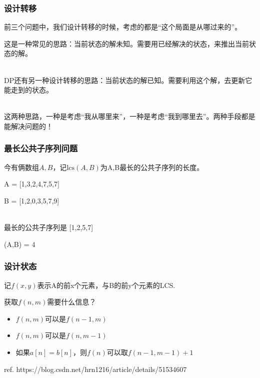 \documentclass{beamer}
\begin{document}
\begin{frame}
    \frametitle{设计转移}

    前三个问题中，我们设计转移的时候，考虑的都是“这个局面是从哪过来的”。

    这是一种常见的思路：当前状态的解未知。需要用已经解决的状态，来推出当前状态的解。
    \pause

    ~\\

    DP还有另一种设计转移的思路：当前状态的解已知。需要利用这个解，去更新它能走到的状态。
    \pause

    ~\\

    这两种思路，一种是考虑“我从哪里来”，一种是考虑“我到哪里去”。两种手段都是能解决问题的！

\end{frame}

\begin{frame}
    \frametitle{最长公共子序列问题}

    今有俩数组$A,B$，记$\text{lcs}(A,B)$为A,B最长的公共子序列的长度。

    \begin{example}
        A = [1,3,2,4,7,5,7]
       
        B = [1,2,0,3,5,7,9]

        ~\\
        最长的公共子序列是 [1,2,5,7]

        (A,B) = 4
    \end{example}

\end{frame}

\begin{frame}
    \frametitle{设计状态}

    记$f(x, y)$表示A的前x个元素，与B的前y个元素的LCS.

    获取$f(n, m)$需要什么信息？

    \pause

    \begin{itemize}
        \item $f(n, m)$可以是$f(n-1, m)$
        \item $f(n, m)$可以是$f(n, m-1)$
        \item 如果$a[n] = b[n]$，则$f(n)$可以取$f(n-1, m-1)+1$
    \end{itemize}

    ref. https://blog.csdn.net/hrn1216/article/details/51534607

\end{frame}
\end{document}
